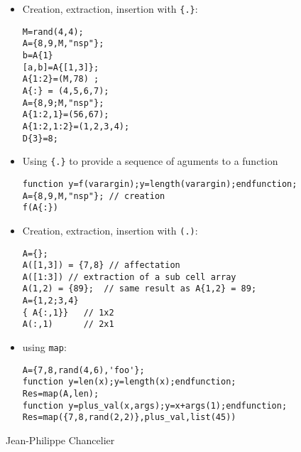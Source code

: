 \begin{examples}
\begin{itemize}
\item Creation, extraction, insertion with \verb+{.}+:
\begin{Verbatim}
M=rand(4,4);
A={8,9,M,"nsp"};  
b=A{1} 	
[a,b]=A{[1,3]};
A{1:2}=(M,78) ; 
A{:} = (4,5,6,7); 
A={8,9;M,"nsp"};  
A{1:2,1}=(56,67);
A{1:2,1:2}=(1,2,3,4);
D{3}=8;
\end{Verbatim}

\item Using \verb+{.}+ to provide a sequence of aguments to a function
\begin{Verbatim} 
function y=f(varargin);y=length(varargin);endfunction;
A={8,9,M,"nsp"}; // creation 
f(A{:})
\end{Verbatim}
\item Creation, extraction, insertion with \verb+(.)+:
\begin{Verbatim}
A={}; 
A([1,3]) = {7,8} // affectation 
A([1:3]) // extraction of a sub cell array
A(1,2) = {89};  // same result as A{1,2} = 89;
A={1,2;3,4}
{ A{:,1}}   // 1x2 
A(:,1)      // 2x1 
\end{Verbatim}

\item using \verb+map+:
\begin{Verbatim}
A={7,8,rand(4,6),'foo'}; 
function y=len(x);y=length(x);endfunction;
Res=map(A,len);
function y=plus_val(x,args);y=x+args(1);endfunction;
Res=map({7,8,rand(2,2)},plus_val,list(45))
\end{Verbatim}
\end{itemize}

\end{examples}

\begin{manseealso}

\end{manseealso}

\begin{authors}
  Jean-Philippe Chancelier
\end{authors}





